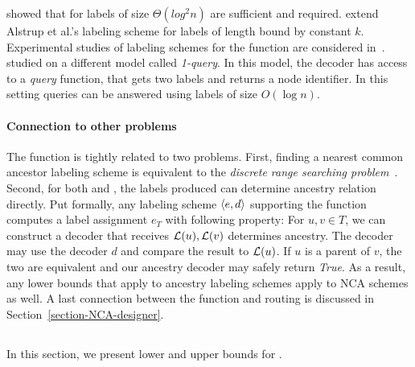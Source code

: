   showed that  for \NCAf  labels of size $\Theta(log^2 n)$ are sufficient and required.
 extend Alstrup et al.'s labeling scheme for labels of length bound by constant $k$.
 Experimental studies of  labeling schemes for the function are considered in~\cite{caminiti2009informative,Fischer09}.
~ studied \NCAf on a different model called  \emph{1-query}. In this model, the decoder has access to a \emph{query} function, that gets two labels and returns  a node identifier.  In this setting  \NCAf queries can be answered using labels of size  $O(\log n)$.
			
\paragraph{Connection to other problems}
The function \NCA  is tightly related to two problems.
First,  finding a nearest common ancestor labeling scheme is equivalent to the \emph{discrete range searching problem}~\cite{gabow}.
Second, for both \NCAf and \NCAl, the  labels produced can determine ancestry relation directly. 
Put formally, any labeling scheme $\left \langle e,d \right \rangle $  supporting the  \NCA function computes a label assignment $e_T$  with following property:
For $u,v \in T$, we can construct a decoder that receives $ \mathcal{L}(u), \mathcal{L}(v)$  determines ancestry.
The decoder may use the \NCA decoder $d$ and compare the result to $ \mathcal{L}(u)$. If $u$ is a parent of $v$, the two are equivalent and our ancestry decoder may safely return \emph{True}.
As a result, any lower bounds that apply to ancestry labeling schemes apply to NCA schemes as well.
A last connection between  the function \NCA and routing is discussed in Section~\ref{section-NCA-designer}.

\subsection{\NCAf} \label{sec-NCA-FIXED}
In this section, we present lower and upper bounds for \NCAf.
